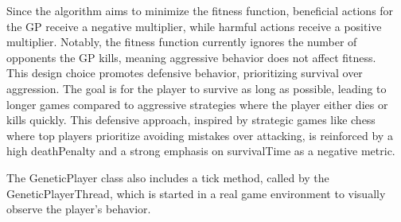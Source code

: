 \documentclass[sigconf]{acmart} %
\begin{document}
Since the algorithm aims to minimize the fitness function, beneficial actions for the GP receive a negative multiplier, while harmful actions receive a positive multiplier. Notably, the fitness function currently ignores the number of opponents the GP kills, meaning aggressive behavior does not affect fitness. \\
This design choice promotes defensive behavior, prioritizing survival over aggression. The goal is for the player to survive as long as possible, leading to longer games compared to aggressive strategies where the player either dies or kills quickly. This defensive approach, inspired by strategic games like chess where top players prioritize avoiding mistakes over attacking, is reinforced by a high deathPenalty and a strong emphasis on survivalTime as a negative metric.

The GeneticPlayer class also includes a tick method, called by the GeneticPlayerThread, which is started in a real game environment to visually observe the player's behavior. 
\end{document}
